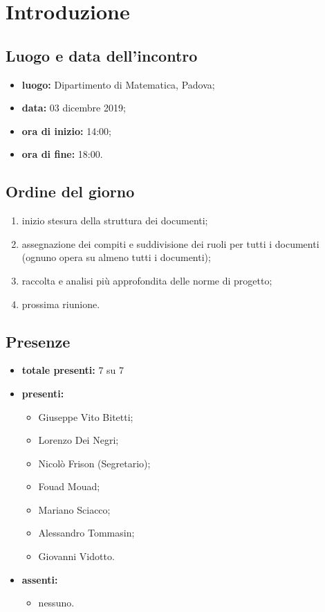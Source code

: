 \section*{Introduzione}

\subsection*{Luogo e data dell'incontro}
	\begin{itemize}
		\item \textbf{luogo:} Dipartimento di Matematica, Padova;
		\item \textbf{data:} 03 dicembre 2019;
		\item \textbf{ora di inizio:} 14:00;
		\item \textbf{ora di fine:} 18:00.
	\end{itemize}

\subsection*{Ordine del giorno}
	\begin{enumerate}
		\item inizio stesura della struttura dei documenti;
		\item assegnazione dei compiti e suddivisione dei ruoli per tutti i documenti (ognuno opera su almeno tutti i documenti);
		\item raccolta e analisi più approfondita delle norme di progetto;
		\item prossima riunione.

	\end{enumerate}

\subsection*{Presenze}
	\begin{itemize}
		\item \textbf{totale presenti:} 7 su 7
		\item \textbf{presenti: }
			\begin{itemize}
				\item Giuseppe Vito Bitetti;
				\item Lorenzo Dei Negri;
				\item Nicolò Frison (Segretario);
				\item Fouad Mouad;
				\item Mariano Sciacco;
				\item Alessandro Tommasin;
				\item Giovanni Vidotto.
			\end{itemize}
		\item \textbf{assenti: }
    \begin{itemize}
			\item nessuno.
		\end{itemize}

	\end{itemize}


